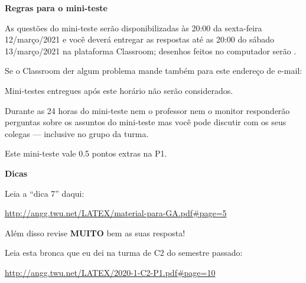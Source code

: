 \documentclass[oneside,12pt]{article}
\begin{document}
\newpage

%

{\bf Regras para o mini-teste}


As questões do mini-teste serão disponibilizadas às 20:00 da
sexta-feira 12/março/2021 e você deverá entregar as respostas
 até as 20:00 do sábado 13/março/2021 na
plataforma Classroom; desenhos feitos no computador serão
.

Se o Classroom der algum problema mande também para este endereço de
e-mail:

\ssk


\ssk

Mini-testes entregues após este horário não serão considerados.

Durante as 24 horas do mini-teste nem o professor nem o monitor
responderão perguntas sobre os assuntos do mini-teste mas você pode
discutir com os seus colegas --- inclusive no grupo da turma.

Este mini-teste vale 0.5 pontos extras na P1.


\newpage


{\bf Dicas}

\ssk

Leia a ``dica 7'' daqui:

\ssk

\url{http://angg.twu.net/LATEX/material-para-GA.pdf\#page=5}

\bsk

Além disso revise {\bf MUITO} bem as suas resposta!

Leia esta bronca que eu dei na turma de C2 do semestre passado:

\ssk

\url{http://angg.twu.net/LATEX/2020-1-C2-P1.pdf\#page=10}
\end{document}
